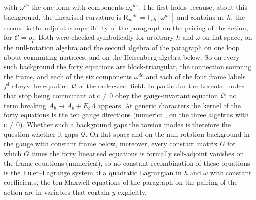 with \(\omega^{de}\) the one-form with components \(\omega_a{}^{de}\). The first holds because, about this background, the linearised curvature is \(\mathsf R_{ab}{}^{de}=\mathsf F_{ab}[\omega^{de}]\) and contains no \(h\); the second is the adjoint compatibility of the paragraph on the pairing of the action, for \(\mathcal C=\rho_I\). Both were checked symbolically for arbitrary \(h\) and \(\omega\) on flat space, on the null-rotation algebra and the second algebra of the paragraph on one loop about commuting matrices, and on the Heisenberg algebra below. So on every such background the forty equations are block-triangular, the connection sourcing the frame, and each of the six components \(\omega^{de}\) and each of the four frame labels \(f^I\) obeys the equation \(\mathcal Q\) of the order-zero field. In particular the Lorentz modes that stop being commutant at \(\mathsf c\neq0\) obey the gauge-invariant equation \(\mathcal Q\); no term breaking \(A_b\to A_b+E_b\Lambda\) appears. At generic characters the kernel of the forty equations is the ten gauge directions (numerical, on the three algebras with \(\mathsf c\neq0\)). Whether such a background gaps the torsion modes is therefore the question whether it gaps \(\mathcal Q\). On flat space and on the null-rotation background in the gauge with constant frame below, moreover, every constant matrix \(G\) for which \(G\) times the forty linearised equations is formally self-adjoint vanishes on the frame equations (numerical), so no constant recombination of these equations is the Euler--Lagrange system of a quadratic Lagrangian in \(h\) and \(\omega\) with constant coefficients; the ten Maxwell equations of the paragraph on the pairing of the action are in variables that contain \(y\) explicitly.

